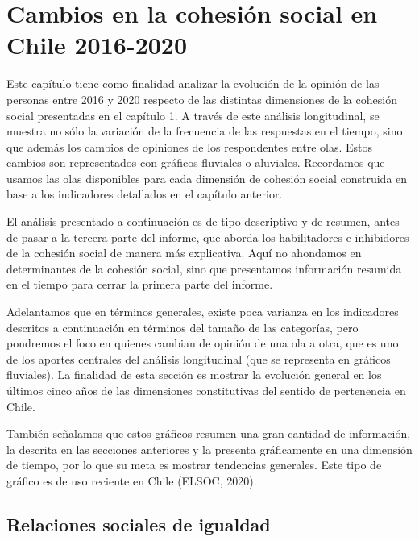 \documentclass[
  12pt,
]{book}
\begin{document}
\hypertarget{cambios-en-la-cohesiuxf3n-social-en-chile-2016-2020}{%
\chapter{Cambios en la cohesión social en Chile 2016-2020}\label{cambios-en-la-cohesiuxf3n-social-en-chile-2016-2020}}

Este capítulo tiene como finalidad analizar la evolución de la opinión de las personas entre 2016 y 2020 respecto de las distintas dimensiones de la cohesión social presentadas en el capítulo 1. A través de este análisis longitudinal, se muestra no sólo la variación de la frecuencia de las respuestas en el tiempo, sino que además los cambios de opiniones de los respondentes entre olas. Estos cambios son representados con gráficos fluviales o aluviales. Recordamos que usamos las olas disponibles para cada dimensión de cohesión social construida en base a los indicadores detallados en el capítulo anterior.

El análisis presentado a continuación es de tipo descriptivo y de resumen, antes de pasar a la tercera parte del informe, que aborda los habilitadores e inhibidores de la cohesión social de manera más explicativa. Aquí no ahondamos en determinantes de la cohesión social, sino que presentamos información resumida en el tiempo para cerrar la primera parte del informe.

Adelantamos que en términos generales, existe poca varianza en los indicadores descritos a continuación en términos del tamaño de las categorías, pero pondremos el foco en quienes cambian de opinión de una ola a otra, que es uno de los aportes centrales del análisis longitudinal (que se representa en gráficos fluviales). La finalidad de esta sección es mostrar la evolución general en los últimos cinco años de las dimensiones constitutivas del sentido de pertenencia en Chile.

También señalamos que estos gráficos resumen una gran cantidad de información, la descrita en las secciones anteriores y la presenta gráficamente en una dimensión de tiempo, por lo que su meta es mostrar tendencias generales. Este tipo de gráfico es de uso reciente en Chile (ELSOC, 2020).

\hypertarget{relaciones-sociales-de-igualdad-1}{%
\section{Relaciones sociales de igualdad}\label{relaciones-sociales-de-igualdad-1}}
\end{document}

